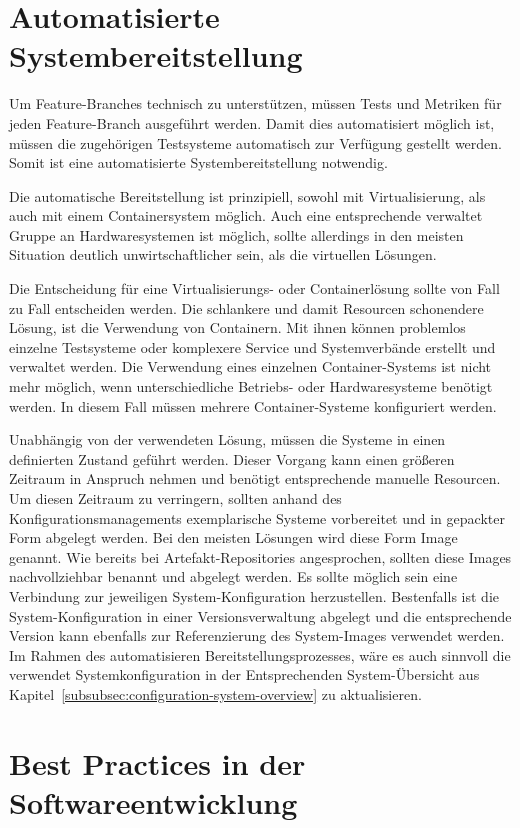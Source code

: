 \section{Automatisierte Systembereitstellung}

Um Feature-Branches technisch zu unterstützen, müssen Tests und Metriken für jeden Feature-Branch ausgeführt werden. Damit dies automatisiert möglich ist, müssen die zugehörigen Testsysteme automatisch zur Verfügung gestellt werden. Somit ist eine automatisierte Systembereitstellung notwendig.

Die automatische Bereitstellung ist prinzipiell, sowohl mit Virtualisierung, als auch mit einem Containersystem möglich. Auch eine entsprechende verwaltet Gruppe an Hardwaresystemen ist möglich, sollte allerdings in den meisten Situation deutlich unwirtschaftlicher sein, als die virtuellen Lösungen.

Die Entscheidung für eine Virtualisierungs- oder Containerlösung sollte von Fall zu Fall entscheiden werden. Die schlankere und damit Resourcen schonendere Lösung, ist die Verwendung von Containern. Mit ihnen können problemlos einzelne Testsysteme oder komplexere Service und Systemverbände erstellt und verwaltet werden. Die Verwendung eines einzelnen Container-Systems ist nicht mehr möglich, wenn unterschiedliche Betriebs- oder Hardwaresysteme benötigt werden. In diesem Fall müssen mehrere Container-Systeme konfiguriert werden.

Unabhängig von der verwendeten Lösung, müssen die Systeme in einen definierten Zustand geführt werden. Dieser Vorgang kann einen größeren Zeitraum in Anspruch nehmen und benötigt entsprechende manuelle Resourcen. Um diesen Zeitraum zu verringern, sollten anhand des Konfigurationsmanagements exemplarische Systeme vorbereitet und in gepackter Form abgelegt werden. Bei den meisten Lösungen wird diese Form \glqq Image\grqq{} genannt. Wie bereits bei \glqq Artefakt-Repositories\grqq{} angesprochen, sollten diese Images nachvollziehbar benannt und abgelegt werden. Es sollte möglich sein eine Verbindung zur jeweiligen System-Konfiguration herzustellen. Bestenfalls ist die System-Konfiguration in einer Versionsverwaltung abgelegt und die entsprechende Version kann ebenfalls zur Referenzierung des System-Images verwendet werden. Im Rahmen des automatisieren Bereitstellungsprozesses, wäre es auch sinnvoll die verwendet Systemkonfiguration in der Entsprechenden System-Übersicht aus Kapitel~\ref{subsubsec:configuration-system-overview} zu aktualisieren.

\section{Best Practices in der Softwareentwicklung}

